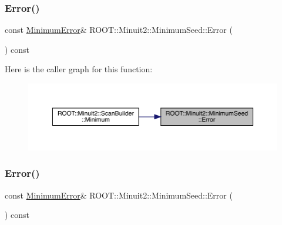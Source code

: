 \mbox{\label{classROOT_1_1Minuit2_1_1MinimumSeed_a19cc15c1feb45267a1a8b2cdb4f25ac2}} 
\subsubsection{\texorpdfstring{Error()}{Error()}\hspace{0.1cm}{\footnotesize\ttfamily [1/2]}}
{\footnotesize\ttfamily const \mbox{\hyperlink{classROOT_1_1Minuit2_1_1MinimumError}{Minimum\+Error}}\& R\+O\+O\+T\+::\+Minuit2\+::\+Minimum\+Seed\+::\+Error (\begin{DoxyParamCaption}{ }\end{DoxyParamCaption}) const\hspace{0.3cm}{\ttfamily [inline]}}

Here is the caller graph for this function\+:\nopagebreak
\begin{figure}[H]
\begin{center}
\leavevmode
\includegraphics[width=350pt]{d1/d50/classROOT_1_1Minuit2_1_1MinimumSeed_a19cc15c1feb45267a1a8b2cdb4f25ac2_icgraph}
\end{center}
\end{figure}
\mbox{\label{classROOT_1_1Minuit2_1_1MinimumSeed_a19cc15c1feb45267a1a8b2cdb4f25ac2}} 
\subsubsection{\texorpdfstring{Error()}{Error()}\hspace{0.1cm}{\footnotesize\ttfamily [2/2]}}
{\footnotesize\ttfamily const \mbox{\hyperlink{classROOT_1_1Minuit2_1_1MinimumError}{Minimum\+Error}}\& R\+O\+O\+T\+::\+Minuit2\+::\+Minimum\+Seed\+::\+Error (\begin{DoxyParamCaption}{ }\end{DoxyParamCaption}) const\hspace{0.3cm}{\ttfamily [inline]}}

